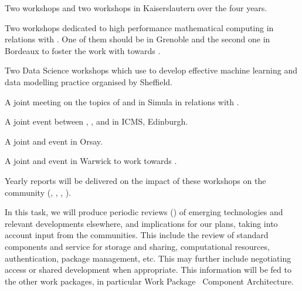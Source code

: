 \begin{workpackage}
\begin{tasklist}
\begin{task}[title=Community building: development workshops, lead=PS,PM=24, partners={UB,UK,SR,SA,USH}, id=devel-workshops, wphases=0-48]
\begin{compactitem}
\item Two \Singular workshops and two \GAP workshops in Kaiserslautern
  over the four years.

\item Two workshops dedicated to high performance mathematical
  computing in relations with . One of them should be in
  Grenoble and the second one in Bordeaux to foster the work with
  \Pari towards .

\item Two Data Science workshops which use \TheProject to develop effective machine learning and data modelling practice organised by Sheffield.

\item A joint meeting on the topics of \SMC and \Jupyter in Simula in
  relations with .

\item A joint event between \GAP, \Sage, and \Singular in ICMS,
  Edinburgh.

\item A joint \Jupyter and \Sage event in Orsay.

\item A joint \LMFDB and \Sage event in Warwick to work towards
  .

\end{compactitem}

Yearly reports will be delivered on the impact of these workshops on the community (, , , ).

\end{task}


\begin{task}[title=Reviewing emerging technologies, id=tech-review, lead=PS, partners={SA,USO,USH,US,UV,UB,SR},PM=11, wphases=0-48]
  In this task, we will produce periodic reviews () of emerging
  technologies and relevant developments elsewhere, and implications
  for our plans, taking into account input from the communities. This
  include the review of standard components and service for storage
  and sharing, computational resources, authentication, package
  management, etc. This may further include negotiating access or
  shared development when appropriate. This information will be fed to
  the other work packages, in particular Work
  Package~ Component Architecture. 
\end{task}



\end{tasklist}
\end{workpackage}
